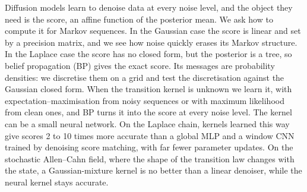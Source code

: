 Diffusion models learn to denoise data at every noise level, and the object they need is the score, an affine function
of the posterior mean. We ask how to compute it for Markov sequences. In the Gaussian case the score is linear and set
by a precision matrix, and we see how noise quickly erases its Markov structure. In the Laplace case the score has no
closed form, but the posterior is a tree, so belief propagation (BP) gives the exact score. Its messages
are probability densities: we discretise them on a grid and test the discretisation against the Gaussian closed form.
When the transition kernel is unknown we learn it, with expectation--maximisation from noisy sequences or with maximum
likelihood from clean ones, and BP turns it into the score at every noise level. The kernel can be a small neural
network. On the Laplace chain, kernels learned this way give scores 2 to 10 times more accurate than a global MLP and a
window CNN trained by denoising score matching, with far fewer parameter updates. On the stochastic Allen--Cahn field,
where the shape of the transition law changes with the state, a Gaussian-mixture kernel is no better than a linear
denoiser, while the neural kernel stays accurate.
